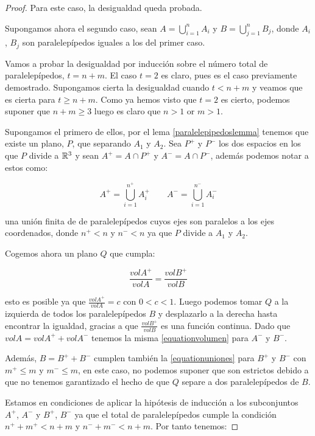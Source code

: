 \begin{proof}
Para este caso, la desigualdad queda probada.

Supongamos ahora el segundo caso, sean $A = \displaystyle\bigcup_{i=1}^n A_i$ y $B = \displaystyle\bigcup_{j=1}^n B_j$, donde $A_i$, $B_j$ son paralelepípedos iguales a los del primer caso.

Vamos a probar la desigualdad por inducción sobre el número total de paralelepípedos, $t = n + m$.
El caso $t=2$ es claro, pues es el caso previamente demostrado.
Supongamos cierta la desigualdad cuando $t < n + m$ y veamos que es cierta para $t \geq n + m$. Como ya hemos visto que $t=2$ es cierto, podemos suponer que $n + m \geq 3$ luego es claro que $n > 1$ or $m > 1$.

Supongamos el primero de ellos, por el lema \ref{paralelepipedoslemma} tenemos que existe un plano, $P$, que separando $A_1$ y $A_2$. Sea $P^+$ y $P^-$ los dos espacios en los que $P$ divide a $\mathbb{R}^3$ y sean $A^+ = A \cap P^+$ y $A^- = A \cap P^-$, además podemos notar a estos como:

\begin{equation}\label{equationuniones}
    A^+ = \displaystyle\bigcup_{i=1}^{n^+} A_i^+ \qquad A^- = \displaystyle\bigcup_{i=1}^{n^-} A_i^-
\end{equation}

una unión finita de de paralelepípedos cuyos ejes son paralelos a los ejes coordenados, donde $n^+ < n$ y $n^- < n$ ya que $P$ divide a $A_1$ y $A_2$.

Cogemos ahora un plano $Q$ que cumpla:

\begin{equation}\label{equationvolumen}
    \frac{vol A^+}{vol A} = \frac{vol B^+}{vol B}
\end{equation}

esto es posible ya que $\frac{vol A^+}{vol A} = c$ con $0 < c < 1$. Luego podemos tomar $Q$ a la izquierda de todos los paralelepípedos $B$ y desplazarlo a la derecha hasta encontrar la igualdad, gracias a que $\frac{vol B^+}{vol B}$ es una función continua.
Dado que $vol A = vol A^+ + vol A^-$ tenemos la misma \autoref{equationvolumen} para $A^-$ y $B^-$.

Además, $B = B^+ + B^-$ cumplen también la \autoref{equationuniones} para $B^+$ y $B^-$ con $m^+ \leq m$ y $m^- \leq m$, en este caso, no podemos suponer que son estrictos debido a que no tenemos garantizado el hecho de que $Q$ separe a dos paralelepípedos de $B$.

Estamos en condiciones de aplicar la hipótesis de inducción a los subconjuntos $A^+$, $A^-$ y $B^+$, $B^-$ ya que el total de paralelepípedos cumple la condición $n^+ + m^+ < n + m$ y $n^- + m^- < n + m$. Por tanto tenemos:


\end{proof}
